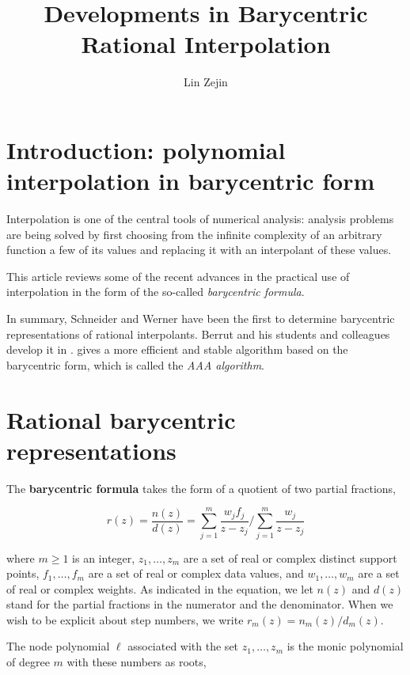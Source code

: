 \documentclass[11pt]{article}
\title{Developments in Barycentric Rational Interpolation}
\author{Lin Zejin}
\date{}
\theoremstyle{definition}
\begin{document}
\maketitle
\section{Introduction: polynomial interpolation in barycentric form}

Interpolation is one of the central tools of numerical analysis: analysis problems are being solved by first choosing from the infinite complexity of an arbitrary function a few of its  values and replacing it with an interpolant of these values. 

This article reviews some of the recent advances in the practical use of interpolation in the form of the so-called \textit{barycentric formula}.

In summary, Schneider and Werner \cite{schneider1986rational} have been the first to determine barycentric representations of rational
interpolants. Berrut and his students and colleagues develop it in \cite{berrut1997matrices,berrut2005barycentric}. \cite{AAAalg} gives a more efficient and stable algorithm based on the barycentric form, which is called the \textit{AAA algorithm}.

\section{Rational barycentric representations} 
    The \textbf{barycentric formula} takes the form of a quotient of two partial fractions,
    
    
    \begin{equation*}
    r(z)=\frac{n(z)}{d(z)}=\sum_{j=1}^{m} \frac{w_{j} f_{j}}{z-z_{j}} / \sum_{j=1}^{m} \frac{w_{j}}{z-z_{j}} \tag{2.1}
    \end{equation*}
    
    
    where $m \geq 1$ is an integer, $z_{1}, \ldots, z_{m}$ are a set of real or complex distinct support points, $f_{1}, \ldots, f_{m}$ are a set of real or complex data values, and $w_{1}, \ldots, w_{m}$ are a set of real or complex weights. As indicated in the equation, we let $n(z)$ and $d(z)$ stand for the partial fractions in the numerator and the denominator. When we wish to be explicit about step numbers, we write $r_{m}(z)=n_{m}(z) / d_{m}(z)$.
    
    The node polynomial $\ell$ associated with the set $z_{1}, \ldots, z_{m}$ is the monic polynomial of degree $m$ with these numbers as roots,
    
\end{document}
